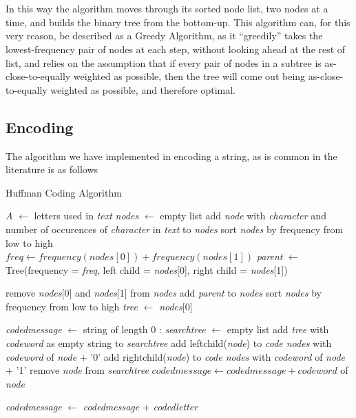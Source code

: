\documentclass[paper=a4, fontsize=10pt]{article} %
\numberwithin{equation}{section} %
\numberwithin{figure}{section} %
\numberwithin{table}{section} %
\begin{document}
\\
\\
In this way the algorithm moves through its sorted node list, two nodes at a time, and builds the binary tree from the bottom-up. This algorithm can, for this very reason, be described as a Greedy Algorithm, as it ``greedily'' takes the lowest-frequency pair of nodes at each step, without looking ahead at the rest of list, and relies on the assumption that if every pair of nodes in a subtree is as-close-to-equally weighted as possible, then the tree will come out being as-close-to-equally weighted as possible, and therefore optimal.


\subsection{Encoding}
The algorithm we have implemented in encoding a string, as is common in the literature \cite{huffman52}\cite{mackay} is as follows

\begin{algorithm}[h]
\caption{Huffman Coding Algorithm}\label{alg:huffman}
\begin{algorithmic}[1]
\State \textit{A} $\gets$ letters used in \textit{text}
\State \textit{nodes} $\gets$ empty list
\State add \textit{node} with \textit{character} and number of occurences of \textit{character} in \textit{text} to \textit{nodes}
\EndFor
\State sort \textit{nodes} by frequency from low to high
\EndProcedure
\\
\State $freq \gets frequency(nodes[0]) + frequency(nodes[1])$
\State \textit{parent} $\gets$ Tree(frequency = \textit{freq}, left child =  \textit{nodes}[0], right child = \textit{nodes}[1])

\State remove \textit{nodes}[0] and \textit{nodes}[1] from \textit{nodes}
\State add \textit{parent} to \textit{nodes}
\State sort \textit{nodes} by frequency from low to high
\EndWhile
\State \textit{tree} $\gets$ \textit{nodes}[0]
\EndProcedure
\\

\State \textit{codedmessage} $\gets$ string of length 0
:
\State \textit{searchtree} $\gets$ empty list
\State add \textit{tree} with \textit{codeword} as empty string to \textit{searchtree}
\State add leftchild(\textit{node}) to \textit{code nodes} with \textit{codeword} of \textit{node} + '0'
\State add rightchild(\textit{node}) to \textit{code nodes} with \textit{codeword} of \textit{node} + '1'
\State remove \textit{node} from \textit{searchtree}
\Else
{}
\State $codedmessage \gets codedmessage + codeword$ of \textit{node}
\EndIf
\EndIf
\EndFor


\State \textit{codedmessage} $\gets$ \textit{codedmessage} + \textit{codedletter}
\EndFor
\\
\\
\EndProcedure
\end{algorithmic}
\end{algorithm}
\end{document}
